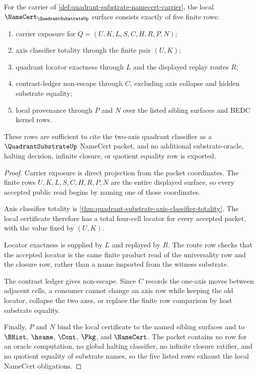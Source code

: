 \begin{theorem}
\label{thm:quadrant-substrate-namecert-obligations}
For the carrier of \autoref{def:quadrant-substrate-namecert-carrier}, the local $\NameCert_{\QuadrantSubstrateUp}$ surface consists exactly of five finite rows:
\begin{enumerate}
\item carrier exposure for $Q=(U,K,L,S,C,H,R,P,N)$;
\item axis classifier totality through the finite pair $(U,K)$;
\item quadrant locator exactness through $L$ and the displayed replay routes $R$;
\item contrast-ledger non-escape through $C$, excluding axis collapse and hidden substrate equality;
\item local provenance through $P$ and $N$ over the listed sibling surfaces and BEDC kernel rows.
\end{enumerate}
These rows are sufficient to cite the two-axis quadrant classifier as a $\QuadrantSubstrateUp$ NameCert packet, and no additional substrate-oracle, halting decision, infinite closure, or quotient equality row is exported.
\end{theorem}
\begin{proof}
Carrier exposure is direct projection from the packet coordinates. The finite rows $U,K,L,S,C,H,R,P,N$ are the entire displayed surface, so every accepted public read begins by naming one of those coordinates.

Axis classifier totality is \autoref{thm:quadrant-substrate-axis-classifier-totality}. The local certificate therefore has a total four-cell locator for every accepted packet, with the value fixed by $(U,K)$.

Locator exactness is supplied by $L$ and replayed by $R$. The route row checks that the accepted locator is the same finite product read of the universality row and the closure row, rather than a name imported from the witness substrate.

The contrast ledger gives non-escape. Since $C$ records the one-axis moves between adjacent cells, a consumer cannot change an axis row while keeping the old locator, collapse the two axes, or replace the finite row comparison by host substrate equality.

Finally, $P$ and $N$ bind the local certificate to the named sibling surfaces and to $\BHist$, $\hsame$, $\Cont$, $\Pkg$, and $\NameCert$. The packet contains no row for an oracle computation, no global halting classifier, no infinite closure ratifier, and no quotient equality of substrate names, so the five listed rows exhaust the local NameCert obligations.
\end{proof}

